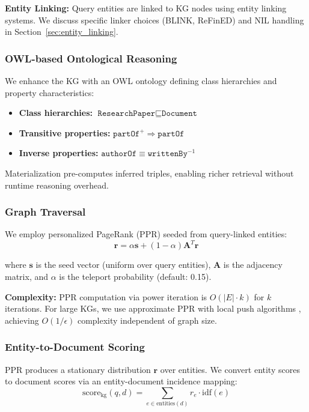 \documentclass[11pt,a4paper]{article}
\begin{document}
\textbf{Entity Linking:} Query entities are linked to KG nodes using entity linking systems. We discuss specific linker choices (BLINK, ReFinED) and NIL handling in Section~\ref{sec:entity_linking}.

\subsubsection{OWL-based Ontological Reasoning}

We enhance the KG with an OWL ontology defining class hierarchies and property characteristics:
\begin{itemize}
    \item \textbf{Class hierarchies:} $\texttt{ResearchPaper} \sqsubseteq \texttt{Document}$
    \item \textbf{Transitive properties:} $\texttt{partOf}^+ \Rightarrow \texttt{partOf}$
    \item \textbf{Inverse properties:} $\texttt{authorOf} \equiv \texttt{writtenBy}^{-1}$
\end{itemize}

Materialization pre-computes inferred triples, enabling richer retrieval without runtime reasoning overhead.

\subsubsection{Graph Traversal}

We employ personalized PageRank (PPR) seeded from query-linked entities:
\begin{equation}
\mathbf{r} = \alpha \mathbf{s} + (1 - \alpha) \mathbf{A}^T \mathbf{r}
\end{equation}

where $\mathbf{s}$ is the seed vector (uniform over query entities), $\mathbf{A}$ is the adjacency matrix, and $\alpha$ is the teleport probability (default: 0.15).

\textbf{Complexity:} PPR computation via power iteration is $O(|E| \cdot k)$ for $k$ iterations. For large KGs, we use approximate PPR with local push algorithms \citep{andersen2006local}, achieving $O(1/\epsilon)$ complexity independent of graph size.

\subsubsection{Entity-to-Document Scoring}
\label{sec:entity_doc_mapping}

PPR produces a stationary distribution $\mathbf{r}$ over entities. We convert entity scores to document scores via an entity-document incidence mapping:
\begin{equation}
\text{score}_{\text{kg}}(q, d) = \sum_{e \in \text{entities}(d)} r_e \cdot \text{idf}(e)
\end{equation}
\end{document}
